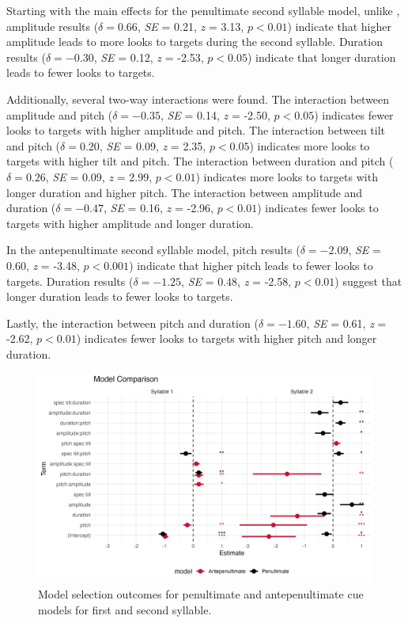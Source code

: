 Starting with the main effects for the penultimate second syllable model, unlike \cite{Sulpizio_McQueen_2012}, amplitude results ($\delta = 0.66$, \textit{SE} = 0.21, \textit{z} = 3.13, $p < 0.01$) indicate that higher amplitude leads to more looks to targets during the second syllable. Duration results ($\delta = -0.30$, \textit{SE} = 0.12, \textit{z} = -2.53, $p < 0.05$) indicate that longer duration leads to fewer looks to targets.

Additionally, several two-way interactions were found. The interaction between amplitude and pitch ($\delta = -0.35$, \textit{SE} = 0.14, \textit{z} = -2.50, $p < 0.05$) indicates fewer looks to targets with higher amplitude and pitch. The interaction between tilt and pitch ($\delta = 0.20$, \textit{SE} = 0.09, \textit{z} = 2.35, $p < 0.05$) indicates more looks to targets with higher tilt and pitch. The interaction between duration and pitch ($\delta = 0.26$, \textit{SE} = 0.09, \textit{z} = 2.99, $p < 0.01$) indicates more looks to targets with longer duration and higher pitch. The interaction between amplitude and duration ($\delta = -0.47$, \textit{SE} = 0.16, \textit{z} = -2.96, $p < 0.01$) indicates fewer looks to targets with higher amplitude and longer duration.

In the antepenultimate second syllable model, pitch results ($\delta = -2.09$, \textit{SE} = 0.60, \textit{z} = -3.48, $p < 0.001$) indicate that higher pitch leads to fewer looks to targets. Duration results ($\delta = -1.25$, \textit{SE} = 0.48, \textit{z} = -2.58, $p < 0.01$) suggest that longer duration leads to fewer looks to targets.

Lastly, the interaction between pitch and duration ($\delta = -1.60$, \textit{SE} = 0.61, \textit{z} = -2.62, $p < 0.01$) indicates fewer looks to targets with higher pitch and longer duration.

\begin{figure}[H]
  \centering
  \includegraphics[width=1\linewidth]{visuals/analysis_3_plot.jpeg} %
  \caption{Model selection outcomes for penultimate and antepenultimate cue models for first and second syllable.}
  \label{fig:analysis_3_plot }
\end{figure}

